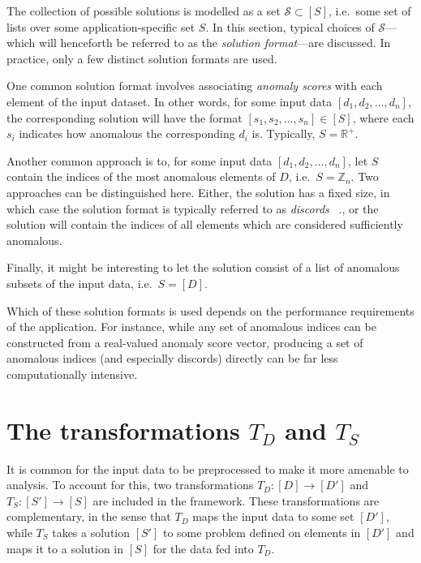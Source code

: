 The collection of possible solutions is modelled as a set $\mathcal{S} \subset [S]$, i.e.\ some set of lists over some application-specific set $S$. In this section, typical choices of $\mathcal{S}$---which will henceforth be referred to as the \emph{solution format}---are discussed. In practice, only a few distinct solution formats are used.

One common solution format involves associating \emph{anomaly scores} with each element of the input dataset. In other words, for some input data $[d_1, d_2, \dots, d_n]$, the corresponding solution will have the format $[s_1, s_2, \dots, s_n] \in [S]$, where each $s_i$ indicates how anomalous the corresponding $d_i$ is. Typically,  $S = \mathbb{R}^+$.

Another common approach is to, for some input data $[d_1, d_2, \dots, d_n]$, let $S$ contain the indices of the most anomalous elements of $D$, i.e.\ $S = \mathbb{Z}_n$. Two approaches can be distinguished here. Either, the solution has a fixed size, in which case the solution format is typically referred to as \emph{discords}~\cite{keogh1} \cite{bu} \cite{yankov} \cite{fu} \cite{lin}., or the solution will contain the indices of all elements which are considered sufficiently anomalous.

Finally, it might be interesting to let the solution consist of a list of anomalous subsets of the input data, i.e.\ $S = [D]$.

Which of these solution formats is used depends on the performance requirements of the application. For instance, while any set of anomalous indices can be constructed from a real-valued anomaly score vector, producing a set of anomalous indices (and especially discords) directly can be far less computationally intensive.

\section{The transformations $T_D$ and $T_S$}

It is common for the input data to be preprocessed to make it more amenable to analysis. To account for this, two transformations $T_D: [D] \rightarrow [D']$ and $T_S: [S'] \rightarrow [S]$ are included in the framework. These transformations are complementary, in the sense that $T_D$ maps the input data to some set $[D']$, while $T_S$ takes a solution $[S']$ to some problem defined on elements in $[D']$ and maps it to a solution in $[S]$ for the data fed into $T_D$.

